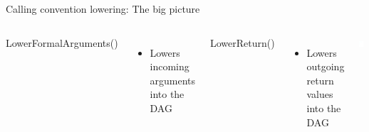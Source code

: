 
\begin{frame}[fragile]{Calling convention lowering: The big picture}

\begin{columns}[t]
    LowerFormalArguments()
    \begin{itemize}
        \item Lowers incoming arguments into the DAG
    \end{itemize}

    LowerReturn()
    \begin{itemize}
        \item Lowers outgoing return values into the DAG
    \end{itemize}
    
    \begin{block}{}
        \includegraphics[width = 0.8\textwidth]{examples/ex1-entry-selection-dag.png}
    \end{block}
\end{columns}    

\end{frame}

